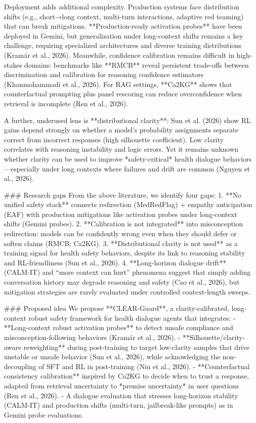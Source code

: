 Deployment adds additional complexity. Production systems face distribution shifts (e.g., short→long context, multi-turn interactions, adaptive red teaming) that can break mitigations. **Production-ready activation probes** have been deployed in Gemini, but generalization under long-context shifts remains a key challenge, requiring specialized architectures and diverse training distributions (Kramár et al., 2026). Meanwhile, confidence calibration remains difficult in high-stakes domains: benchmarks like **RMCB** reveal persistent trade-offs between discrimination and calibration for reasoning confidence estimators (Khanmohammadi et al., 2026). For RAG settings, **Ca2KG** shows that counterfactual prompting plus panel rescoring can reduce overconfidence when retrieval is incomplete (Ren et al., 2026).  

A further, underused lens is **distributional clarity**: Sun et al. (2026) show RL gains depend strongly on whether a model’s probability assignments separate correct from incorrect responses (high silhouette coefficient). Low clarity correlates with reasoning instability and logic errors. Yet it remains unknown whether clarity can be used to improve *safety-critical* health dialogue behaviors—especially under long contexts where failures and drift are common (Nguyen et al., 2026).  

### Research gaps  
From the above literature, we identify four gaps:  
1. **No unified safety stack** connects redirection (MedRedFlag) + empathy anticipation (EAF) with production mitigations like activation probes under long-context shifts (Gemini probes).  
2. **Calibration is not integrated** into misconception redirection: models can be confidently wrong even when they should defer or soften claims (RMCB; Ca2KG).  
3. **Distributional clarity is not used** as a training signal for health safety behaviors, despite its link to reasoning stability and RL-friendliness (Sun et al., 2026).  
4. **Long-horizon dialogue drift** (CALM-IT) and “more context can hurt” phenomena suggest that simply adding conversation history may degrade reasoning and safety (Cao et al., 2026), but mitigation strategies are rarely evaluated under controlled context-length sweeps.

### Proposed idea  
We propose **CLEAR-Guard**, a clarity-calibrated, long-context robust safety framework for health dialogue agents that integrates:  
- **Long-context robust activation probes** to detect unsafe compliance and misconception-following behaviors (Kramár et al., 2026).  
- **Silhouette/clarity-aware reweighting** during post-training to target low-clarity samples that drive unstable or unsafe behavior (Sun et al., 2026), while acknowledging the non-decoupling of SFT and RL in post-training (Niu et al., 2026).  
- **Counterfactual consistency calibration** inspired by Ca2KG to decide when to trust a response, adapted from retrieval uncertainty to *premise uncertainty* in user questions (Ren et al., 2026).  
- A dialogue evaluation that stresses long-horizon stability (CALM-IT) and production shifts (multi-turn, jailbreak-like prompts) as in Gemini probe evaluations.


